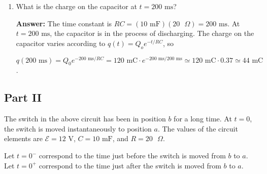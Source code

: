 \documentclass{article}
\begin{document}
\begin{enumerate}
  \item What is the charge on the capacitor at $t = 200\text{ ms}$?

        \ifsolutions
        {\bf Answer: } The time constant is $RC= (10\text{ mF}) (20\text{ }\Omega) = 200\text{ ms}$. At $t = 200\text{ ms}$, the capacitor is in the process of discharging. The charge on the capacitor varies according to $q(t)=Q_oe^{-t/RC}$, so

        $q(200\text{ ms}) = Q_0e^{-200\text{ ms}/RC} = 120\text{ mC} \cdot e^{-200\text{ ms}/200\text{ ms}} \simeq120\text{ mC}\cdot 0.37 \simeq 44 \text{ mC}$.
        \else

        \fi
        \ifsolutions\else

        \fi

\end{enumerate}

\newpage

\subsection{Part II}



The switch in the above circuit has been in position $b$ for a long time. At $t = 0$, the switch is moved instantaneously to position $a$. The values of the circuit elements are $\mathcal{E}= 12\text{ V}$, $C = 10\text{ mF}$, and $R = 20\text{ }\Omega$.

Let $t=0^-$ correspond to the time just before the switch is moved from $b$ to $a$. Let $t=0^+$ correspond to the time just after the switch is moved from $b$ to $a$.
\end{document}
